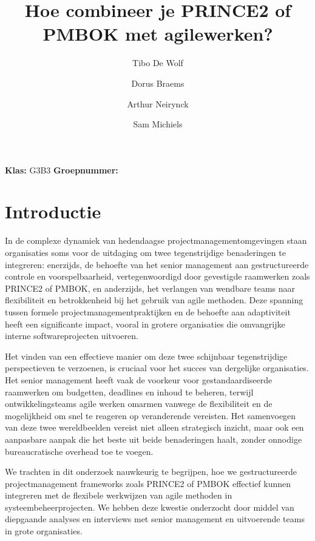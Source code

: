 \documentclass[dutch]{hogent-article}
\title{Hoe combineer je PRINCE2 of PMBOK met agile\linebreak werken?}
\author{Tibo De Wolf}
\author{Dorus Braems}
\author{Arthur Neirynck}
\author{Sam Michiels}
\begin{document}
\begin{abstract}

\end{abstract}
\bigskip
\textbf{Klas:} G3B3
\newline
\textbf{Groepnummer:} 


\newpage

\tableofcontents
\pagebreak

\section{Introductie}%
\label{sec:introductie}

In de complexe dynamiek van hedendaagse projectmanagementomgevingen staan organisaties soms voor de uitdaging om twee tegenstrijdige benaderingen te integreren: enerzijds, de behoefte van het senior management aan gestructureerde controle en voorspelbaarheid, vertegenwoordigd door gevestigde raamwerken zoals PRINCE2 of PMBOK, en anderzijds, het verlangen van wendbare teams naar flexibiliteit en betrokkenheid bij het gebruik van agile methoden. Deze spanning tussen formele projectmanagementpraktijken en de behoefte aan adaptiviteit heeft een significante impact, vooral in grotere organisaties die omvangrijke interne softwareprojecten uitvoeren.
\newline

Het vinden van een effectieve manier om deze twee schijnbaar tegenstrijdige perspectieven te verzoenen, is cruciaal voor het succes van dergelijke organisaties. Het senior management heeft vaak de voorkeur voor gestandaardiseerde raamwerken om budgetten, deadlines en inhoud te beheren, terwijl ontwikkelingsteams agile werken omarmen vanwege de flexibiliteit en de mogelijkheid om snel te reageren op veranderende vereisten. Het samenvoegen van deze twee wereldbeelden vereist niet alleen strategisch inzicht, maar ook een aanpasbare aanpak die het beste uit beide benaderingen haalt, zonder onnodige bureaucratische overhead toe te voegen.
\newline

We trachten in dit onderzoek nauwkeurig te begrijpen, hoe we gestructureerde projectmanagement frameworks zoals PRINCE2 of PMBOK effectief kunnen integreren met de flexibele werkwijzen van agile methoden in systeembeheerprojecten. We hebben deze kwestie onderzocht door middel van diepgaande analyses en interviews met senior management en uitvoerende teams in grote \linebreak organisaties.
\newline
\end{document}
